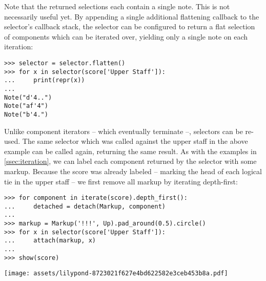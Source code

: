 \noindent Note that the returned selections each contain a single note. This is
not necessarily useful yet. By appending a single additional flattening
callback to the selector's callback stack, the selector can be configured to
return a flat selection of components which can be iterated over, yielding only
a single note on each iteration:

\begin{comment}
<abjad>
selector = selector.flatten()
for x in selector(score['Upper Staff']):
    print(repr(x))

</abjad>
\end{comment}

\begin{abjadbookoutput}
\begin{singlespacing}
\vspace{-0.5\baselineskip}
\begin{verbatim}
>>> selector = selector.flatten()
>>> for x in selector(score['Upper Staff']):
...     print(repr(x))
...
Note("d'4..")
Note("af'4")
Note("b'4.")
\end{verbatim}
\end{singlespacing}
\end{abjadbookoutput}

\noindent Unlike component iterators -- which eventually terminate --,
selectors can be re-used. The same selector which was called against the upper
staff in the above example can be called again, returning the same result. As
with the examples in \autoref{ssec:iteration}, we can label each component
returned by the selector with some markup. Because the score was already
labeled -- marking the head of each logical tie in the upper staff -- we first
remove all markup by iterating depth-first:

\begin{comment}
<abjad>
for component in iterate(score).depth_first():
    detached = detach(Markup, component)

markup = Markup('!!!', Up).pad_around(0.5).circle()
for x in selector(score['Upper Staff']):
    attach(markup, x)

show(score)
</abjad>
\end{comment}

\begin{abjadbookoutput}
\begin{singlespacing}
\vspace{-0.5\baselineskip}
\begin{verbatim}
>>> for component in iterate(score).depth_first():
...     detached = detach(Markup, component)
...
>>> markup = Markup('!!!', Up).pad_around(0.5).circle()
>>> for x in selector(score['Upper Staff']):
...     attach(markup, x)
...
>>> show(score)
\end{verbatim}
\noindent\texttt{[image: assets/lilypond-8723021f627e4bd622582e3ceb453b8a.pdf]}
\end{singlespacing}
\end{abjadbookoutput}

